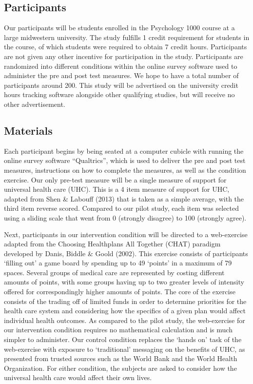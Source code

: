 \documentclass[
]{article}
\begin{document}
\hypertarget{participants-1}{%
\subsection{Participants}\label{participants-1}}

Our participants will be students enrolled in the Psychology 1000 course
at a large midwestern university. The study fulfills 1 credit
requirement for students in the course, of which students were required
to obtain 7 credit hours. Participants are not given any other incentive
for participation in the study. Participants are randomized into
different conditions within the online survey software used to
administer the pre and post test measures. We hope to have a total
number of participants around 200. This study will be advertised on the
university credit hours tracking software alongside other qualifying
studies, but will receive no other advertisement.

\hypertarget{materials-1}{%
\subsection{Materials}\label{materials-1}}

Each participant begins by being seated at a computer cubicle with
running the online survey software ``Qualtrics'', which is used to
deliver the pre and post test measures, instructions on how to complete
the measures, as well as the condition exercise. Our only pre-test
measure will be a single measure of support for universal health care
(UHC). This is a 4 item measure of support for UHC, adapted from Shen \&
Labouff (2013) that is taken as a simple average, with the third item
reverse scored. Compared to our pilot study, each item was selected
using a sliding scale that went from 0 (strongly disagree) to 100
(strongly agree).

Next, participants in our intervention condition will be directed to a
web-exercise adapted from the Choosing Healthplans All Together (CHAT)
paradigm developed by Danis, Biddle \& Goold (2002). This exercise
consists of participants `filling out' a game board by spending up to 49
`points' in a maximum of 79 spaces. Several groups of medical care are
represented by costing different amounts of points, with some groups
having up to two greater levels of intensity offered for correspondingly
higher amounts of points. The core of the exercise consists of the
trading off of limited funds in order to determine priorities for the
health care system and considering how the specifics of a given plan
would affect individual health outcomes. As compared to the pilot study,
the web-exercise for our intervention condition requires no mathematical
calculation and is much simpler to administer. Our control condition
replaces the `hands on' task of the web-exercise with exposure to
`traditional' messaging on the benefits of UHC, as presented from
trusted sources such as the World Bank and the World Health
Organization. For either condition, the subjects are asked to consider
how the universal health care would affect their own lives.
\end{document}
